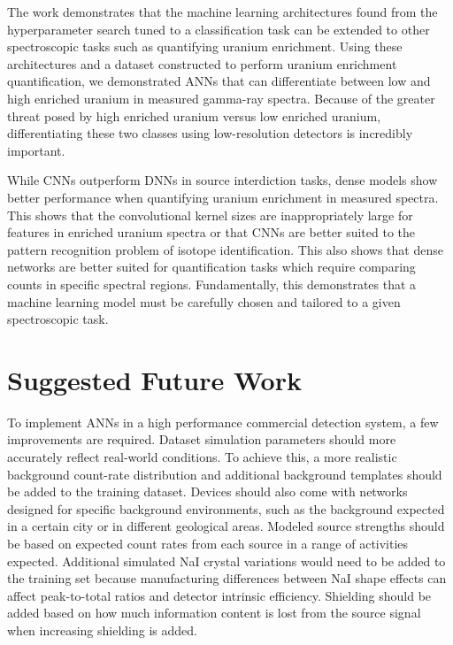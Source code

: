The work demonstrates that the machine learning architectures found from the hyperparameter search tuned to a classification task can be extended to other spectroscopic tasks such as quantifying uranium enrichment. Using these architectures and a dataset constructed to perform uranium enrichment quantification, we demonstrated ANNs that can differentiate between low and high enriched uranium in measured gamma-ray spectra. Because of the greater threat posed by high enriched uranium versus low enriched uranium, differentiating these two classes using low-resolution detectors is incredibly important.

While CNNs outperform DNNs in source interdiction tasks, dense models show better performance when quantifying uranium enrichment in measured spectra. This shows that the convolutional kernel sizes are inappropriately large for features in enriched uranium spectra or that CNNs are better suited to the pattern recognition problem of isotope identification. This also shows that dense networks are better suited for quantification tasks which require comparing counts in specific spectral regions. Fundamentally, this demonstrates that a machine learning model must be carefully chosen and tailored to a given spectroscopic task.






\section{Suggested Future Work}

To implement ANNs in a high performance commercial detection system, a few improvements are required. Dataset simulation parameters should more accurately reflect real-world conditions. To achieve this, a more realistic background count-rate distribution and additional background templates should be added to the training dataset. Devices should also come with networks designed for specific background environments, such as the background expected in a certain city or in different geological areas. Modeled source strengths should be based on expected count rates from each source in a range of activities expected. Additional simulated NaI crystal variations would need to be added to the training set because manufacturing differences between NaI shape effects can affect peak-to-total ratios and detector intrinsic efficiency. Shielding should be added based on how much information content is lost from the source signal when increasing shielding is added.

